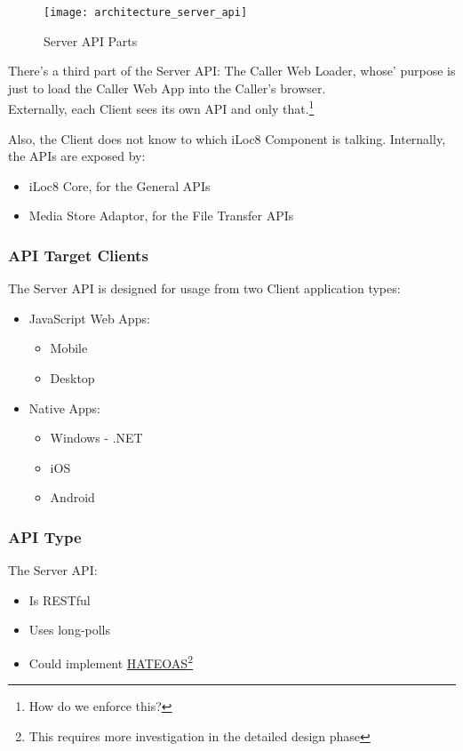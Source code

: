\documentclass{article}
\begin{document}
	\begin{figure}[htbp]
		\hspace{0cm}
		\texttt{[image: architecture\_server\_api]}
		\caption{Server API Parts}
		\label{fig:architecture_server_api}
	\end{figure}

	There's a third part of the Server API: The Caller Web Loader, whose' purpose is just to load the Caller Web App into the Caller's browser. \\
	
	Externally, each Client sees its own API and only that.\footnote{How do we enforce this?}

	Also, the Client does not know to which iLoc8 Component is talking. Internally, the APIs are exposed by:
	\begin{itemize}
		\item iLoc8 Core, for the General APIs
		\item Media Store Adaptor, for the File Transfer APIs
	\end{itemize}
	
	\subsubsection{API Target Clients}
	
	The Server API is designed for usage from two Client application types:
	\begin{itemize}
		\item JavaScript Web Apps:
		\begin{itemize}
			\item Mobile
			\item Desktop
		\end{itemize}
		\item Native Apps:
		\begin{itemize}
			\item Windows - .NET
			\item iOS
			\item Android
		\end{itemize}
	\end{itemize}
	
	\subsubsection{API Type}
	
	The Server API:
	\begin{itemize}
		\item Is RESTful
		\item Uses long-polls
		\item Could implement \href{http://timelessrepo.com/haters-gonna-hateoas}{HATEOAS}\footnote{This requires more investigation in the detailed design phase}
	\end{itemize}
	
\end{document}
